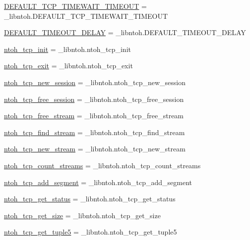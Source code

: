 \begin{DoxyCompactItemize}
\item 
\hyperlink{namespacelibntoh_a539494dd5b88b4fc7bf506c8c69f2f67}{D\-E\-F\-A\-U\-L\-T\-\_\-\-T\-C\-P\-\_\-\-T\-I\-M\-E\-W\-A\-I\-T\-\_\-\-T\-I\-M\-E\-O\-U\-T} = \-\_\-libntoh.\-D\-E\-F\-A\-U\-L\-T\-\_\-\-T\-C\-P\-\_\-\-T\-I\-M\-E\-W\-A\-I\-T\-\_\-\-T\-I\-M\-E\-O\-U\-T
\item 
\hyperlink{namespacelibntoh_ab2759e6c614d0e774f51d366b4a7d9ae}{D\-E\-F\-A\-U\-L\-T\-\_\-\-T\-I\-M\-E\-O\-U\-T\-\_\-\-D\-E\-L\-A\-Y} = \-\_\-libntoh.\-D\-E\-F\-A\-U\-L\-T\-\_\-\-T\-I\-M\-E\-O\-U\-T\-\_\-\-D\-E\-L\-A\-Y
\item 
\hyperlink{namespacelibntoh_a50e4b9cf1914c048d31ffaca7d255186}{ntoh\-\_\-tcp\-\_\-init} = \-\_\-libntoh.\-ntoh\-\_\-tcp\-\_\-init
\item 
\hyperlink{namespacelibntoh_a340fd8622da67843a00646b5602a9277}{ntoh\-\_\-tcp\-\_\-exit} = \-\_\-libntoh.\-ntoh\-\_\-tcp\-\_\-exit
\item 
\hyperlink{namespacelibntoh_abb5b777cb35d1287872144928b49f566}{ntoh\-\_\-tcp\-\_\-new\-\_\-session} = \-\_\-libntoh.\-ntoh\-\_\-tcp\-\_\-new\-\_\-session
\item 
\hyperlink{namespacelibntoh_a623e317826b44c1ccff0aa6dfd92b7e3}{ntoh\-\_\-tcp\-\_\-free\-\_\-session} = \-\_\-libntoh.\-ntoh\-\_\-tcp\-\_\-free\-\_\-session
\item 
\hyperlink{namespacelibntoh_a3e56d364c40d6074370f90e410961829}{ntoh\-\_\-tcp\-\_\-free\-\_\-stream} = \-\_\-libntoh.\-ntoh\-\_\-tcp\-\_\-free\-\_\-stream
\item 
\hyperlink{namespacelibntoh_ab534ac1a739dc7c414e5543ce689d90e}{ntoh\-\_\-tcp\-\_\-find\-\_\-stream} = \-\_\-libntoh.\-ntoh\-\_\-tcp\-\_\-find\-\_\-stream
\item 
\hyperlink{namespacelibntoh_a33b87761f876b3e317a4e0ceda7859d2}{ntoh\-\_\-tcp\-\_\-new\-\_\-stream} = \-\_\-libntoh.\-ntoh\-\_\-tcp\-\_\-new\-\_\-stream
\item 
\hyperlink{namespacelibntoh_ab3d839526fe3363ddc246b4c4c08cd40}{ntoh\-\_\-tcp\-\_\-count\-\_\-streams} = \-\_\-libntoh.\-ntoh\-\_\-tcp\-\_\-count\-\_\-streams
\item 
\hyperlink{namespacelibntoh_a419c097d453b148c874967b7fbc8bbdd}{ntoh\-\_\-tcp\-\_\-add\-\_\-segment} = \-\_\-libntoh.\-ntoh\-\_\-tcp\-\_\-add\-\_\-segment
\item 
\hyperlink{namespacelibntoh_a0eac786f80cf5f6eb61952e0f6beadac}{ntoh\-\_\-tcp\-\_\-get\-\_\-status} = \-\_\-libntoh.\-ntoh\-\_\-tcp\-\_\-get\-\_\-status
\item 
\hyperlink{namespacelibntoh_a809b36e4b42e73fd143f1f1d64e363f5}{ntoh\-\_\-tcp\-\_\-get\-\_\-size} = \-\_\-libntoh.\-ntoh\-\_\-tcp\-\_\-get\-\_\-size
\item 
\hyperlink{namespacelibntoh_aa6115fe2c6ed851c198074aaf8843173}{ntoh\-\_\-tcp\-\_\-get\-\_\-tuple5} = \-\_\-libntoh.\-ntoh\-\_\-tcp\-\_\-get\-\_\-tuple5
\end{DoxyCompactItemize}


